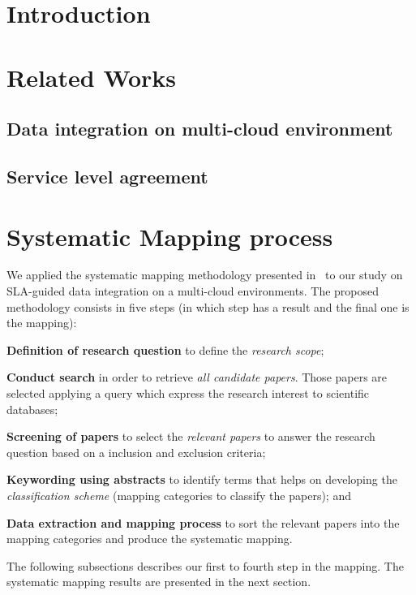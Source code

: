 \documentclass[preprint,12pt]{elsarticle}
\theoremstyle{plain}
\theoremstyle{plain}
\theoremstyle{plain}
\theoremstyle{plain}
\begin{document}


\section{Introduction}
\label{sec:intro}

\section{Related Works}

\subsection{Data integration on multi-cloud environment}

\subsection{Service level agreement}

\section{Systematic Mapping process}
We applied the systematic mapping methodology presented in~\cite{SM:Petersen:2008} to our study on SLA-guided data integration on a multi-cloud environments. 
The proposed methodology consists in five steps (in which step has a result and the final one is the mapping):
\begin{description}
\item \textbf{Definition of research question} to define the \textit{research scope};
\item \textbf{Conduct search} in order to retrieve \textit{all candidate papers}. Those papers are selected applying a query which express the research interest to scientific databases;
\item  \textbf{Screening of papers} to select the \textit{relevant papers} to answer the research question based on a inclusion and exclusion criteria;
\item \textbf{Keywording using abstracts} to identify terms that helps on developing the \textit{classification scheme} (mapping categories to classify the papers); and
\item \textbf{Data extraction and mapping process} to sort the relevant papers into the mapping categories and produce the systematic mapping.
\end{description}
\bigskip The following subsections describes our first to fourth step in the mapping. The systematic mapping results are presented in the next section.
\end{document}
